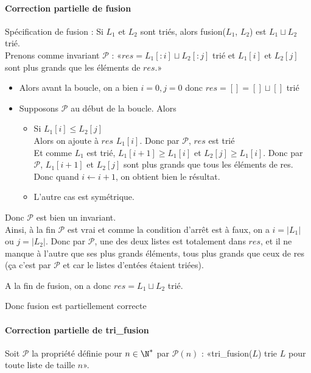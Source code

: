 \paragraph{Correction partielle de fusion}
Spécification de fusion : Si $L_1$ et $L_2$ sont triés, alors fusion($L_1$, $L_2$) est $L_1 \sqcup L_2$ trié.\\

Prenons comme invariant $\mathcal P$ : «$res = L_1[:i] \sqcup L_2[:j]$ trié et $L_1[i]$ et $L_2[j]$ sont plus grands que les éléments de $res$.»

\begin{itemize}[label=$\star$]
	\item Alors avant la boucle, on a bien $i = 0, j=0$ donc $res = [] = []\sqcup[]$ trié
	\item Supposons $\mathcal P$ au début de la boucle. Alors 
	\begin{itemize}[label=$\star\star$]
		\item Si $L_1[i] \leq L_2[j]$\\
		Alors on ajoute à $res$ $L_1[i]$. Donc par $\mathcal P$, $res$ est trié\\
		Et comme $L_1$ est trié, $L_1[i+1] \geq L_1[i]$ et $L_2[j] \geq L_1[i]$. Donc par $\mathcal P$, $L_1[i+1]$ et $L_2[j]$ sont plus grands que tous les éléments de res.
		Donc quand $i \gets i+1$, on obtient bien le résultat.
		\item L'autre cas est symétrique.
	\end{itemize}
\end{itemize}

Donc $\mathcal P$ est bien un invariant.\\
Ainsi, à la fin $\mathcal P$ est vrai et comme la condition d'arrêt est à faux, on a $i = |L_1|$ ou $j = |L_2|$. Donc par $\mathcal P$, une des deux listes est totalement dans $res$, et il ne manque à l'autre que ses plus grands éléments, tous plus grands que ceux de res (ça c'est par $\mathcal P$ et car le listes d'entées étaient triées).

A la fin de fusion, on a donc $res = L_1 \sqcup L_2$ trié.

Donc fusion est partiellement correcte

\paragraph{Correction partielle de tri\_fusion} Soit $\mathcal P$ la propriété définie pour $n \in \N^*$ par $\mathcal P(n)$ : «tri\_fusion($L$) trie $L$ pour toute liste de taille $n$».\\

